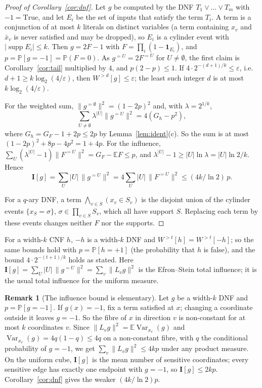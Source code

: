 \documentclass[11pt,reqno]{amsart}
\theoremstyle{definition}
\newtheorem{remark}[theorem]{Remark}
\newcommand{\E}{\mathbb E}
\newcommand{\PP}{\mathbb P}
\newcommand{\supp}{\operatorname{supp}}
\begin{document}
\begin{proof}[Proof of Corollary~\ref{cor:dnf}]
Let $g$ be computed by the DNF $T_1\vee\dots\vee T_m$ with $-1=\mathrm{True}$, and let
$E_i$ be the set of inputs that satisfy the term $T_i$.  A term is a conjunction
of at most $k$ literals on distinct variables (a term containing $x_v$ and
$\bar x_v$ is never satisfied and may be dropped), so $E_i$ is a cylinder event
with $|\supp E_i|\le k$.  Then $g=2F-1$ with $F=\prod_i(1-\mathbf 1_{E_i})$, and
$p=\PP[g=-1]=\PP(F=0)$.  As $g^{=U}=2F^{=U}$ for $U\ne\emptyset$, the first claim is
Corollary~\ref{cor:tail} multiplied by $4$, and $p(2-p)\le1$.  If
$4\cdot2^{-(d+1)/k}\le\varepsilon$, i.e.\ $d+1\ge k\log_2(4/\varepsilon)$, then $W^{>d}[g]\le\varepsilon$; the
least such integer $d$ is at most $k\log_2(4/\varepsilon)$.

For the weighted sum, $\|g^{=\emptyset}\|^2=(1-2p)^2$ and, with $\lambda=2^{1/k}$,
\[
 \sum_{U\ne\emptyset}\lambda^{|U|}\|g^{=U}\|^2=4(G_h-p^2),
\]
where $G_h=G_F-1+2p\le2p$ by
Lemma~\ref{lem:ident}(c).  So the sum is at most $(1-2p)^2+8p-4p^2=1+4p$.
For the influence, $\sum_U(\lambda^{|U|}-1)\|F^{=U}\|^2=G_F-\E F\le p$, and
$\lambda^{|U|}-1\ge|U|\ln\lambda=|U|\ln2/k$.  Hence
\[
 \mathbf I[g]=\sum_U|U|\,\|g^{=U}\|^2=4\sum_U|U|\,\|F^{=U}\|^2\le(4k/\ln2)\,p .
\]

For a $q$-ary DNF, a term $\bigwedge_{v\in S}(x_v\in S_v)$ is the disjoint union of the
cylinder events $\{x_S=\sigma\}$, $\sigma\in\prod_{v\in S}S_v$, which all have support $S$.
Replacing each term by these events changes neither $F$ nor the supports.
\end{proof}

For a width-$k$ CNF $h$, $-h$ is a width-$k$ DNF and $W^{>t}[h]=W^{>t}[-h]$; so the
same bounds hold with $p=\PP[h=+1]$ (the probability that $h$ is false), and
the bound $4\cdot2^{-(t+1)/k}$ holds as stated.  Here
$\mathbf I[g]=\sum_U|U|\,\|g^{=U}\|^2=\sum_v\|L_vg\|^2$ is the Efron--Stein total influence; it is
the usual total influence for the uniform measure.

\begin{remark}[The influence bound is elementary]\label{rem:influence}
Let $g$ be a width-$k$ DNF and $p=\PP[g=-1]$.  If $g(x)=-1$, fix a term satisfied at
$x$; changing a coordinate outside it leaves $g=-1$.  So the fibre of $x$ in
direction $v$ is non-constant for at most $k$ coordinates $v$.  Since
$\|L_vg\|^2=\E\operatorname{Var}_{x_v}(g)$ and $\operatorname{Var}_{x_v}(g)=4q(1-q)\le4q$ on a non-constant fibre, with
$q$ the conditional probability of $g=-1$, we get $\sum_v\|L_vg\|^2\le4kp$ under any
product measure.  On the uniform cube, $\mathbf I[g]$ is the mean number of
sensitive coordinates; every sensitive edge has exactly one endpoint with
$g=-1$, so $\mathbf I[g]\le2kp$.  Corollary~\ref{cor:dnf} gives the weaker $(4k/\ln2)p$.
\end{remark}
\end{document}
